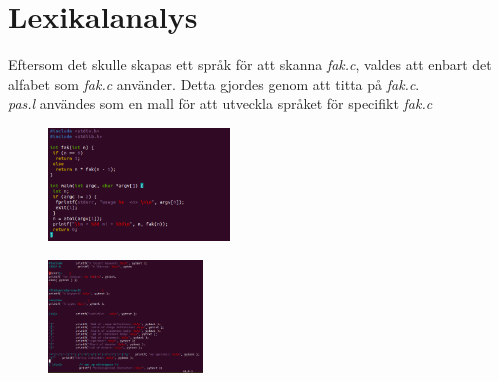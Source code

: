 \section{Lexikalanalys}

Eftersom det skulle skapas ett språk för att skanna \textit{fak.c}, valdes att enbart det alfabet
som \textit{fak.c} använder. Detta gjordes genom att titta på \textit{fak.c}.
\\ \textit{pas.l} användes som en mall för att utveckla språket för specifikt \textit{fak.c} 

\begin{figure}[!h]
    \includegraphics[width=\linewidth,height=3cm]{bilder/fak_c.png}
    \label{fig:fak_c}
\end{figure}


\begin{figure}[!h]
    \includegraphics[width=\linewidth,height=3cm]{bilder/fak_l.png}
    \label{fig:fak_l}
\end{figure}


